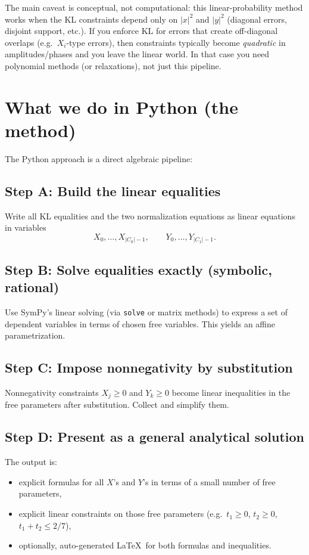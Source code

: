 \documentclass[11pt]{article}
\begin{document}
The main caveat is conceptual, not computational: this linear-probability method works when the KL constraints depend only on $|x|^2$ and $|y|^2$ (diagonal errors, disjoint support, etc.). If you enforce KL for errors that create off-diagonal overlaps (e.g.\ $X_i$-type errors), then constraints typically become \emph{quadratic} in amplitudes/phases and you leave the linear world. In that case you need polynomial methods (or relaxations), not just this pipeline.

\section{What we do in Python (the method)}

The Python approach is a direct algebraic pipeline:

\subsection*{Step A: Build the linear equalities}
Write all KL equalities and the two normalization equations as linear equations in variables
\[
X_0,\dots,X_{|C_0|-1},\qquad Y_0,\dots,Y_{|C_1|-1}.
\]

\subsection*{Step B: Solve equalities exactly (symbolic, rational)}
Use SymPy's linear solving (via \texttt{solve} or matrix methods) to express a set of dependent variables in terms of chosen free variables. This yields an affine parametrization.

\subsection*{Step C: Impose nonnegativity by substitution}
Nonnegativity constraints $X_j\ge 0$ and $Y_k\ge 0$ become linear inequalities in the free parameters after substitution. Collect and simplify them.

\subsection*{Step D: Present as a general analytical solution}
The output is:
\begin{itemize}
  \item explicit formulas for all $X$'s and $Y$'s in terms of a small number of free parameters,
  \item explicit linear constraints on those free parameters (e.g.\ $t_1\ge0$, $t_2\ge0$, $t_1+t_2\le 2/7$),
  \item optionally, auto-generated \LaTeX\ for both formulas and inequalities.
\end{itemize}
\end{document}

